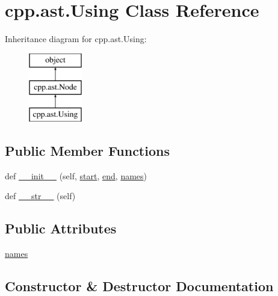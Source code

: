 \hypertarget{classcpp_1_1ast_1_1_using}{}\section{cpp.\+ast.\+Using Class Reference}
\label{classcpp_1_1ast_1_1_using}
Inheritance diagram for cpp.\+ast.\+Using\+:\begin{figure}[H]
\begin{center}
\leavevmode
\includegraphics[height=3.000000cm]{d8/d8e/classcpp_1_1ast_1_1_using}
\end{center}
\end{figure}
\subsection*{Public Member Functions}
\begin{DoxyCompactItemize}
\item 
def \mbox{\hyperlink{classcpp_1_1ast_1_1_using_a9b7a760a06d00f7211c889d9841e06af}{\+\_\+\+\_\+init\+\_\+\+\_\+}} (self, \mbox{\hyperlink{classcpp_1_1ast_1_1_node_a7b2aa97e6a049bb1a93aea48c48f1f44}{start}}, \mbox{\hyperlink{classcpp_1_1ast_1_1_node_a3c5e5246ccf619df28eca02e29d69647}{end}}, \mbox{\hyperlink{classcpp_1_1ast_1_1_using_abc05dedb59eb83857d373cc0e64eccb3}{names}})
\item 
def \mbox{\hyperlink{classcpp_1_1ast_1_1_using_ac209e8e5d84988d14a8f4b30377e5455}{\+\_\+\+\_\+str\+\_\+\+\_\+}} (self)
\end{DoxyCompactItemize}
\subsection*{Public Attributes}
\begin{DoxyCompactItemize}
\item 
\mbox{\hyperlink{classcpp_1_1ast_1_1_using_abc05dedb59eb83857d373cc0e64eccb3}{names}}
\end{DoxyCompactItemize}


\subsection{Constructor \& Destructor Documentation}
\mbox{\label{classcpp_1_1ast_1_1_using_a9b7a760a06d00f7211c889d9841e06af}} 
